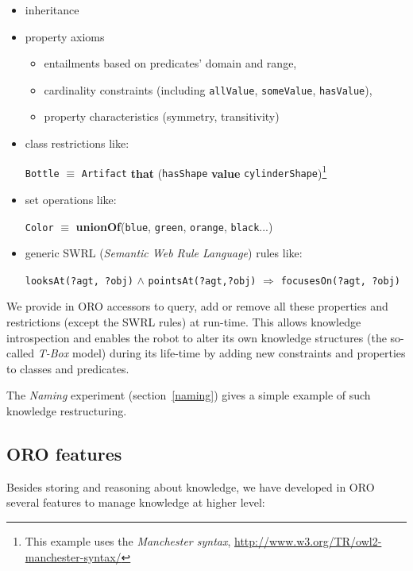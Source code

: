 \documentclass[twocolumn]{svjour3}
\newcommand{\concept}[1]{{\footnotesize \texttt{#1}}}
\begin{document}
\begin{itemize}
	\item inheritance
	\item property axioms
		\begin{itemize}
		\item entailments based on predicates' domain and range,
		\item cardinality constraints (including \concept{allValue}, 
		\concept{someValue}, \concept{hasValue}),
		\item property characteristics (symmetry, transitivity)
		\end{itemize}
	\item class restrictions like: \par \footnotesize \concept{Bottle} $\equiv$
		\concept{Artifact} {\bf that} (\concept{hasShape} {\bf value}
		\concept{cylinderShape})\footnote{This example uses the \emph{Manchester
		syntax}, \url{http://www.w3.org/TR/owl2-manchester-syntax/}} \normalsize
	\item set operations like: \par \footnotesize \concept{Color} $\equiv$ {\bf unionOf}(\concept{blue},
		\concept{green}, \concept{orange}, \concept{black}...) \normalsize
	\item generic SWRL ({\em Semantic Web Rule Language}) rules like: \par
		\footnotesize \concept{looksAt(?agt, ?obj)} $\land$
		\concept{pointsAt(?agt,?obj)} $\Rightarrow$ \concept{focusesOn(?agt, ?obj)}
		\normalsize 
	\end{itemize}

We provide in ORO accessors to query, add or remove all these properties and
restrictions (except the SWRL rules) at run-time. This allows
knowledge introspection and enables the robot to alter its own knowledge
structures (the so-called \emph{T-Box} model) during its life-time by adding
new constraints and properties to classes and predicates.

The \emph{Naming} experiment (section~\ref{naming}) gives a simple example of
such knowledge restructuring.

\subsection{ORO features}
\label{features}

Besides storing and reasoning about knowledge, we have developed in ORO several
features to manage knowledge at higher level: 
\end{document}
